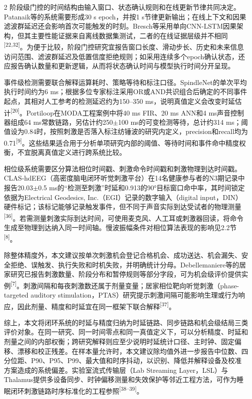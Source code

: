 \documentclass[UTF8,zihao=5,fontset=none]{ctexart}
\newcommand{\refcite}[1]{\nolinebreak[4]\textsuperscript{[#1]}}
\begin{document}
\begin{multicols}{2}
阶段级门控的时间结构由输入窗口、状态确认规则和在线更新节律共同决定。Patanaik等的系统需要形成30 s epoch，并按1 s节律更新输出；在线上下文和因果滤波群延迟还会影响首次可能触发的时刻。Bresch等采用单向CNN-LSTM因果架构，但其主要性能证据来自离线数据集测试，二者的在线证据层级并不相同\refcite{22,32}。为便于比较，阶段门控研究宜报告窗口长度、滑动步长、历史和未来信息访问范围、滤波群延迟及低置信度拒绝规则；如采用连续多个epoch确认状态，还应报告确认数量和更新逻辑，从而将状态确认时间与模型执行时间分开呈现。\par

事件级检测需要联合解释运算耗时、策略等待和标注口径。SpindleNet的单次平均执行时间约为6 ms；根据多位专家标注采用OR或AND共识组合后确定的不同事件起点，其相对人工参考的检测延迟约为150--350 ms，说明真值定义会改变时延估计\refcite{20}。Portiloop在MODA工程案例中将40 ms FIR、20 ms ANN和4 ms声音控制器组成64 ms常数链路，另估计约250$\pm$100 ms的可变检测等待，总计约314 ms；阈值设为0.84时，按照刺激是否落入标注纺锤波的研究内定义，precision和recall均为0.71\refcite{9}。这些结果适合用于分析单项研究内部的阈值、等待时间和事件命中精度权衡，不宜脱离真值定义进行跨系统比较。\par

相位级系统需要区分算法相位时间戳、刺激命令时间戳和刺激物理到达时间戳。CLAS-hdEEG（高密度脑电闭环听觉刺激平台）在14名健康参与者的N3期记录中报告20.03$\pm$0.5 ms的“检测至刺激”时延和0.913的90°目标窗口命中率，其时间锁定依据为Electrical Geodesics, Inc.（EGI）记录的数字输入（digital input，DIN）硬件标记；该标记能够记录触发事件，但不同于声音实际到达受试者的物理测量\refcite{36}。若需测量刺激实际到达时间，可使用麦克风、人工耳或刺激器回读，将命令生成至物理到达纳入同一时间轴。慢波振幅条件对相位算法表现的影响见2.2节\refcite{8}。\par

除整体精度外，本文建议按单次刺激机会登记合格机会、成功送达、机会漏失、安全拒绝、误触发、执行失败和时机失败，并明确统计分母。Debellemaniere等的居家研究已报告刺激数量、阶段分布和暂停规则等部分字段，可为机会级评价提供实例\refcite{7}。刺激间隔和每夜刺激数还属于剂量变量；居家相位靶向听觉刺激（phase-targeted auditory stimulation，PTAS）研究提示刺激间隔可能影响生理或行为响应，因此剂量、精度和时延宜在同一框架下联合解释\refcite{37}。\par

综上，本文将闭环系统的时延与精度归纳为时延链路、同步链路和机会级结局三类评价对象。在同一研究、同一时间零点和同一真值定义下，可以分析精度、时延和剂量之间的内部权衡；跨研究解释则应至少说明时延统计口径、主时钟、固定偏移、漂移和校正残差。在样本量允许时，本文建议除均值外进一步报告中位数、四分位距、P90、P95、P99、最大值和时序抖动，以识别、降低并解释设备及校准方案造成的系统偏差。实验室流式传输层（Lab Streaming Layer，LSL）与Thalamus提供多设备同步、时钟偏移测量和失效保护等邻近工程方法，可作为睡眠闭环刺激链路时序标准化的工程参照\refcite{38--39}。\par


\end{multicols}
\end{document}
